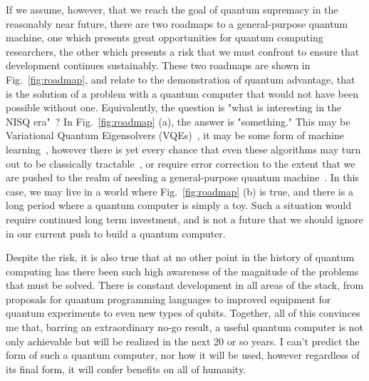 If we assume, however, that we reach the goal of quantum supremacy in the reasonably near future, there are two roadmaps to a general-purpose quantum machine, one which
presents great opportunities for quantum computing researchers, the other which presents a risk that we must confront to ensure that development continues sustainably.
These two roadmaps are shown in Fig.~\ref{fig:roadmap}, and relate to the demonstration of quantum advantage, that is the solution of a problem with a quantum computer
that would not have been possible without one. Equivalently, the question is "what is interesting in the NISQ era"~\cite{Preskill2018quantumcomputingin}? In Fig.~\ref{fig:roadmap}
(a), the answer is "something." This may be Variational Quantum Eigensolvers (VQEs)~\cite{nature23879}, it may be some form of machine learning~\cite{PhysRevLett.121.040502},
however there is yet every chance that even these algorithms may turn out to be classically tractable~\cite{Tang:2019:QCA:3313276.3316310,10.1038/nphys3272}, or require
error correction to the extent that we are pushed to the realm of needing a general-purpose quantum machine~\cite{Reiher7555}. In this case, we may live in a world where
Fig.~\ref{fig:roadmap} (b) is true, and there is a long period where a quantum computer is simply a toy. Such a situation would require continued long term investment,
and is not a future that we should ignore in our current push to build a quantum computer.

Despite the risk, it is also true that at no other point in the history of quantum computing has there been such high awareness of the magnitude of the problems
that must be solved. There is constant development in all areas of the stack, from proposals for quantum programming languages to improved equipment for quantum
experiments to even new types of qubits. Together, all of this convinces me that, barring an extraordinary no-go result, a useful quantum computer is not only
achievable but will be realized in the next 20 or so years. I can't predict the form of such a quantum computer, nor how it will be used, however regardless of
its final form, it will confer benefits on all of humanity.
